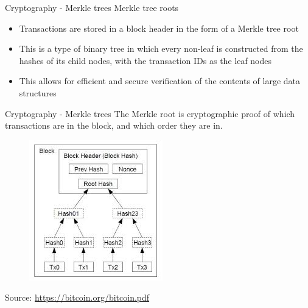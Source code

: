 \documentclass[9pt]{beamer}
\begin{document}

\begin{frame}{Cryptography - Merkle trees}
	Merkle tree roots
	\begin{itemize}
		\item Transactions are stored in a block header in the form of a Merkle tree root
		\item This is a type of binary tree in which every non-leaf is constructed from the hashes of its child nodes, with the transaction IDs as the leaf nodes
		\item This allows for efficient and secure verification of the contents of large data structures
	\end{itemize}
\end{frame}


\begin{frame}{Cryptography - Merkle trees}
	The Merkle root is cryptographic proof of which transactions are in the block, and which order they are in.
	\begin{figure}[]
		\centering
		\includegraphics  [scale=0.5]{Images/images}
	\end{figure}
	\begin{tiny}
		Source: \href{https://bitcoin.org/bitcoin.pdf}{https://bitcoin.org/bitcoin.pdf}
	\end{tiny}
\end{frame}

\end{document}
